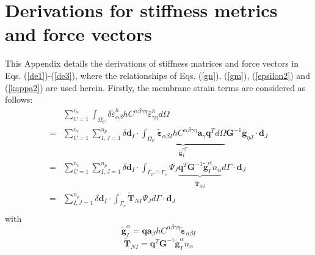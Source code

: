 \section{Derivations for stiffness metrics and force vectors}\label{derivations}
This Appendix details the derivations of stiffness matrices and force vectors in Eqs. (\ref{de1})-(\ref{de3}), where the relationships of Eqs. (\ref{gn}), (\ref{gm}), (\ref{epsilon2}) and (\ref{kappa2}) are used herein. Firstly, the membrane strain terms are considered as follows:
\begin{equation}
\begin{split}
&\sum_{C=1}^{n_e}\int_{\Omega_C} \delta \tilde \varepsilon_{\alpha\beta}^h hC^{\alpha\beta\gamma\eta}\bar \varepsilon^h_{\gamma\eta} d\Omega \\
        =&\sum_{C=1}^{n_e}\sum_{I,J=1}^{n_p}\delta \boldsymbol d_I \cdot \underbrace{\int_{\Omega_C} \tilde{\boldsymbol \varepsilon}_{\alpha\beta I} hC^{\alpha\beta\gamma\eta} \boldsymbol a_\gamma \boldsymbol q^T d\Omega}_{\tilde{\boldsymbol g}^{\eta T}_I} \boldsymbol G^{-1} \bar{\boldsymbol g}_{\eta J} \cdot \boldsymbol d_J \\
        =&\sum_{C=1}^{n_e}\sum_{I,J=1}^{n_p}\delta \boldsymbol d_I \cdot \int_{\Gamma_C\cap\Gamma_v} \Psi_J \underbrace{\boldsymbol q^T \boldsymbol G^{-1}\tilde{\boldsymbol g}^\alpha_I
        n_\alpha}_{\tilde{\boldsymbol T}_{NI}} d\Gamma
       \cdot \boldsymbol d_J \\
        =&\sum_{I,J=1}^{n_p}\delta \boldsymbol d_I \cdot \int_{\Gamma_v} \tilde{\boldsymbol T}_{NI}\Psi_J d\Gamma
       \cdot \boldsymbol d_J \\
\end{split}
\end{equation}
with
\begin{equation}
        \tilde{\boldsymbol g}^\alpha_I = \boldsymbol q \boldsymbol a_\beta hC^{\alpha\beta\gamma\eta} \tilde{\boldsymbol \varepsilon}_{\alpha\beta I}
\end{equation}
\begin{equation}
        \tilde{\boldsymbol T}_{NI} = \boldsymbol q^T \boldsymbol G^{-1} \tilde{\boldsymbol g}_I^\alpha n_\alpha
\end{equation}

